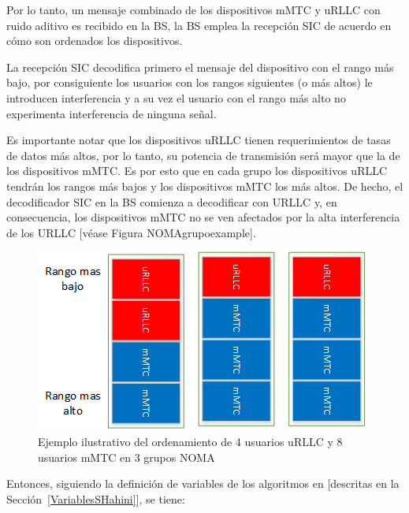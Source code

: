 Por lo tanto, un mensaje combinado de los dispositivos mMTC y uRLLC con ruido aditivo es recibido en la BS, la BS emplea la recepción SIC de acuerdo en cómo son ordenados los dispositivos. \newline

La recepción SIC decodifica primero el mensaje del dispositivo con el rango más bajo, por consiguiente los usuarios con los rangos siguientes (o más altos) le introducen interferencia y a su vez el usuario con el rango más alto no experimenta interferencia de ninguna señal.\newline

Es importante notar que los dispositivos uRLLC tienen requerimientos de tasas de datos más altos, por lo tanto, su potencia de transmisión será mayor que la de los dispositivos mMTC. Es por esto que en cada grupo los dispositivos uRLLC tendrán los rangos más bajos y los dispositivos mMTC los más altos. De hecho, el decodificador SIC en la BS comienza a decodificar con URLLC y, en consecuencia, los dispositivos mMTC no se ven afectados por la alta interferencia de los URLLC [véase Figura NOMAgrupoexample].\newline




\begin{figure}[th]
    \centering
    \includegraphics[scale=1]{Figures/EjemploNOMAclusters}
    \decoRule
    \caption[Ejemplo ilustrativo del ordenamiento de usuarios en los grupos NOMA]{Ejemplo ilustrativo del ordenamiento de 4 usuarios uRLLC y 8 usuarios mMTC en 3 grupos NOMA}
    \label{fig:NOMAgrupoexample}
\end{figure}





Entonces, siguiendo la definición de variables de los algoritmos en \parencite{Shahini2019} [descritas en la Sección~\ref{VariablesSHahini}], se tiene:\newline

